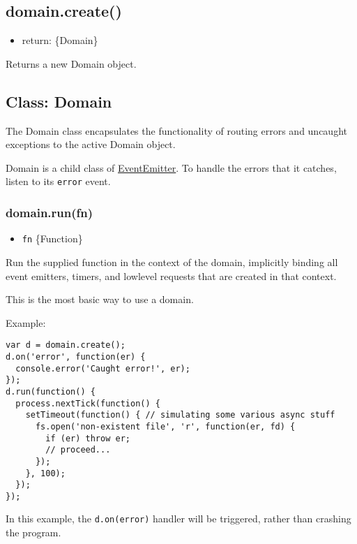 \subsection{domain.create()}\label{domain.create}

\begin{itemize}
\itemsep1pt\parskip0pt
\item
  return: \{Domain\}
\end{itemize}

Returns a new Domain object.

\subsection{Class: Domain}\label{class-domain}

The Domain class encapsulates the functionality of routing errors and
uncaught exceptions to the active Domain object.

Domain is a child class of
\href{events.html\#events_class_events_eventemitter}{EventEmitter}. To
handle the errors that it catches, listen to its \texttt{error} event.

\subsubsection{domain.run(fn)}\label{domain.runfn}

\begin{itemize}
\itemsep1pt\parskip0pt
\item
  \texttt{fn} \{Function\}
\end{itemize}

Run the supplied function in the context of the domain, implicitly
binding all event emitters, timers, and lowlevel requests that are
created in that context.

This is the most basic way to use a domain.

Example:

\begin{verbatim}
var d = domain.create();
d.on('error', function(er) {
  console.error('Caught error!', er);
});
d.run(function() {
  process.nextTick(function() {
    setTimeout(function() { // simulating some various async stuff
      fs.open('non-existent file', 'r', function(er, fd) {
        if (er) throw er;
        // proceed...
      });
    }, 100);
  });
});
\end{verbatim}

In this example, the
\texttt{d.on(\textquotesingle{}error\textquotesingle{})} handler will be
triggered, rather than crashing the program.

